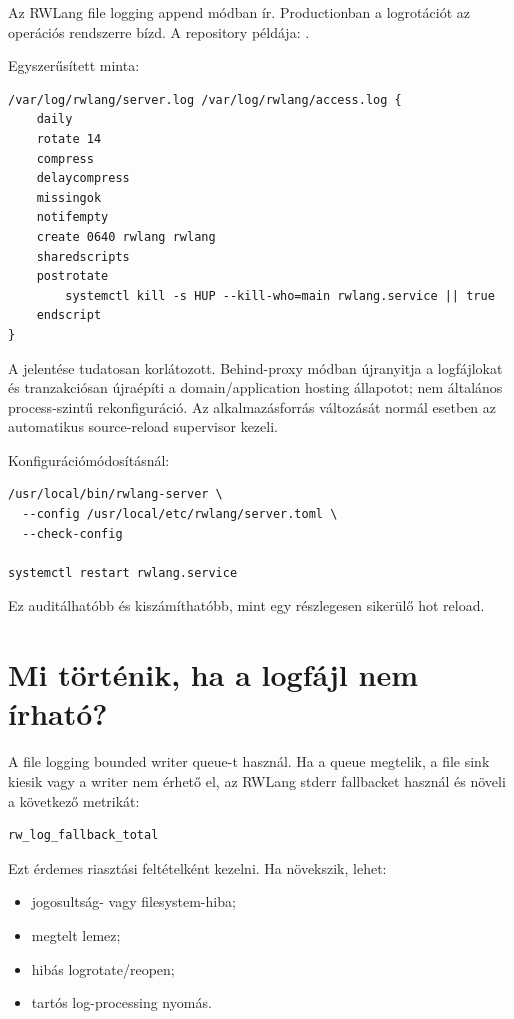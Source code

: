 Az RWLang file logging append módban ír. Productionban a logrotációt az operációs rendszerre bízd. A repository példája: .

Egyszerűsített minta:

\begin{lstlisting}
/var/log/rwlang/server.log /var/log/rwlang/access.log {
    daily
    rotate 14
    compress
    delaycompress
    missingok
    notifempty
    create 0640 rwlang rwlang
    sharedscripts
    postrotate
        systemctl kill -s HUP --kill-who=main rwlang.service || true
    endscript
}
\end{lstlisting}

A  jelentése tudatosan korlátozott. Behind-proxy módban újranyitja a logfájlokat és tranzakciósan újraépíti a domain/application hosting állapotot; nem általános process-szintű  rekonfiguráció. Az alkalmazásforrás változását normál esetben az automatikus source-reload supervisor kezeli.

Konfigurációmódosításnál:

\begin{lstlisting}
/usr/local/bin/rwlang-server \
  --config /usr/local/etc/rwlang/server.toml \
  --check-config

systemctl restart rwlang.service
\end{lstlisting}

Ez auditálhatóbb és kiszámíthatóbb, mint egy részlegesen sikerülő hot reload.

\section{Mi történik, ha a logfájl nem írható?}

A file logging bounded writer queue-t használ. Ha a queue megtelik, a file sink kiesik vagy a writer nem érhető el, az RWLang stderr fallbacket használ és növeli a következő metrikát:

\begin{lstlisting}
rw_log_fallback_total
\end{lstlisting}

Ezt érdemes riasztási feltételként kezelni. Ha növekszik, lehet:

\begin{itemize}
  \item jogosultság- vagy filesystem-hiba;
  \item megtelt lemez;
  \item hibás logrotate/reopen;
  \item tartós log-processing nyomás.
\end{itemize}

